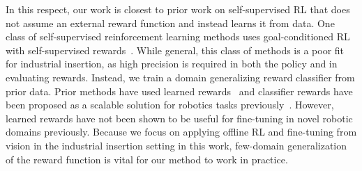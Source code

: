 \documentclass[letterpaper, 10 pt, conference, final]{ieeeconf}   %
\begin{document}
In this respect, our work is closest to prior work on self-supervised RL that does not assume an external reward function and instead learns it from data.
One class of self-supervised reinforcement learning methods uses goal-conditioned RL with self-supervised rewards~\cite{kaelbling1993goals, schaul2015uva, Baranes2012, andrychowicz2017her, nair2018rig, nachum2018hiro, held2018goalgan, Pere2018, wadefarley2019discern, pong2020skewfit, khazatsky2021val}.
While general, this class of methods is a poor fit for industrial insertion, as high precision is required in both the policy and in evaluating rewards.
Instead, we train a domain generalizing reward classifier from prior data.
Prior methods have used learned rewards~\cite{pong2022smac} and classifier rewards have been proposed as a scalable solution for robotics tasks previously~\cite{fu2018vice, singh2019raq}.
However, learned rewards have not been shown to be useful for fine-tuning in novel robotic domains previously.
Because we focus on applying offline RL and fine-tuning from vision in the industrial insertion setting in this work, few-domain generalization of the reward function is vital for our method to work in practice.
\end{document}
